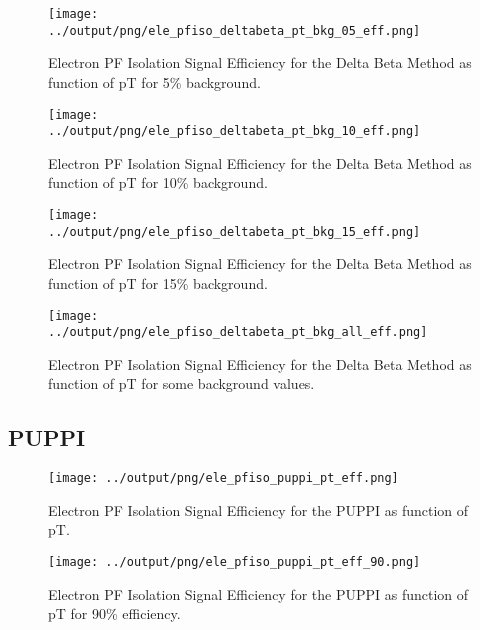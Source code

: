 \documentclass[11pt]{book}
\begin{document}
\begin{figure}[htb]
\centering
\texttt{[image: ../output/png/ele\_pfiso\_deltabeta\_pt\_bkg\_05\_eff.png]}
\caption{Electron PF Isolation Signal Efficiency for the Delta Beta Method as function of pT for 5\% background.}
\label{fig:ele_pfiso_pt_bkg_deltabeta_bkg_05_eff}
\end{figure}

\begin{figure}[htb]
\centering
\texttt{[image: ../output/png/ele\_pfiso\_deltabeta\_pt\_bkg\_10\_eff.png]}
\caption{Electron PF Isolation Signal Efficiency for the Delta Beta Method as function of pT for 10\% background.}
\label{fig:ele_pfiso_pt_bkg_deltabeta_bkg_10_eff}
\end{figure}

\begin{figure}[htb]
\centering
\texttt{[image: ../output/png/ele\_pfiso\_deltabeta\_pt\_bkg\_15\_eff.png]}
\caption{Electron PF Isolation Signal Efficiency for the Delta Beta Method as function of pT for 15\% background.}
\label{fig:ele_pfiso_pt_bkg_deltabeta_bkg_15_eff}
\end{figure}

\begin{figure}[htb]
\centering
\texttt{[image: ../output/png/ele\_pfiso\_deltabeta\_pt\_bkg\_all\_eff.png]}
\caption{Electron PF Isolation Signal Efficiency for the Delta Beta Method as function of pT for some background values.}
\label{fig:ele_pfiso_pt_bkg_deltabeta_bkg_all_eff}
\end{figure}
\clearpage

\subsection{PUPPI}
\begin{figure}[htb]
\centering
\texttt{[image: ../output/png/ele\_pfiso\_puppi\_pt\_eff.png]}
\caption{Electron PF Isolation Signal Efficiency for the PUPPI as function of pT.}
\label{fig:ele_pfiso_pt_eff_puppi}
\end{figure}

\begin{figure}[htb]
\centering
\texttt{[image: ../output/png/ele\_pfiso\_puppi\_pt\_eff\_90.png]}
\caption{Electron PF Isolation Signal Efficiency for the PUPPI as function of pT for 90\% efficiency.}
\label{fig:ele_pfiso_pt_eff_puppi_eff_90}
\end{figure}
\end{document}
